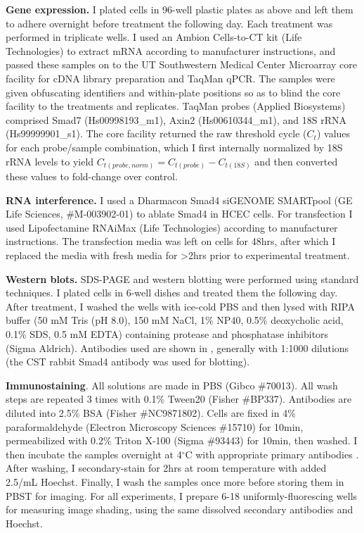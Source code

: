 \textbf{Gene expression.}
I plated cells in 96-well plastic plates as above and left them to
adhere overnight before treatment the following day.
Each treatment was performed in triplicate wells.
I used an Ambion Cells-to-CT
kit (Life Technologies) to extract mRNA according to manufacturer instructions,
and passed these samples on to the UT Southwestern
Medical Center Microarray core facility for
cDNA library preparation and TaqMan qPCR. The samples were
given obfuscating identifiers and within-plate positions
so as to blind the core facility
to the treatments and replicates.
TaqMan probes (Applied Biosystems) comprised
Smad7 (Hs00998193\_m1), Axin2 (Hs00610344\_m1),
and 18S rRNA (Hs99999901\_s1).
The core facility returned the raw threshold cycle ($C_t$)
values for each probe/sample combination, which I first internally
normalized by 18S rRNA levels to yield
$C_{t(probe,norm)}=C_{t(probe)}-C_{t(18S)}$ and then 
converted these values to fold-change over control.


\textbf{RNA interference.}
I used a Dharmacon Smad4 siGENOME SMARTpool
(GE Life Sciences, \#M-003902-01) to ablate Smad4 in HCEC cells.
For transfection I used Lipofectamine RNAiMax
(Life Technologies) according to manufacturer instructions.
The transfection media was left on cells for 48hrs, after
which I replaced the media with fresh media for >2hrs prior
to experimental treatment.


\textbf{Western blots.}
SDS-PAGE and western blotting were performed using standard techniques.
I plated cells in 6-well dishes and treated them the following day.
After treatment, I washed the wells with ice-cold PBS
and then lysed with RIPA buffer (50 mM Tris (pH 8.0), 150 mM NaCl,
1\% NP40, 0.5\% deoxycholic acid, 0.1\% SDS, 0.5 mM EDTA)
containing protease and phosphatase inhibitors (Sigma Aldrich).
Antibodies used are shown in ,
generally with 1:1000 dilutions
(the CST rabbit Smad4 antibody was used
for blotting).


\textbf{Immunostaining}.
All solutions are made in PBS
(Gibco \#70013). All wash steps are repeated 3 times with 0.1\%
Tween20 (Fisher \#BP337). Antibodies are diluted into 2.5\%
BSA (Fisher \#NC9871802). Cells are fixed in 4\%
paraformaldehyde (Electron Microscopy Sciences \#15710) for
10min, permeabilized with 0.2\% Triton X-100 (Sigma \#93443)
for 10min, then washed. I then incubate the samples overnight
at 4$^{\circ}$C with appropriate primary antibodies
.
After washing, I secondary-stain for 2hrs at
room temperature with
added 2.5/mL Hoechst. 
Finally, I wash the samples once more before
storing them in PBST for imaging.
For all experiments, I prepare
6-18 uniformly-fluorescing wells for measuring image
shading, using the same dissolved
secondary antibodies and Hoechst.


